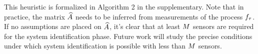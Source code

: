 This heuristic is formalized in Algorithm 2 in the supplementary. Note that in practice, the matrix $\widehat{A}$ needs to be inferred from measurements of the process $f_{\tau}$. If no assumptions are placed on $\widehat{A}$, it's clear that at least $M$ sensors are required for the system identification phase. Future work will study the precise conditions under which system identification is possible with less than $M$ sensors. 
